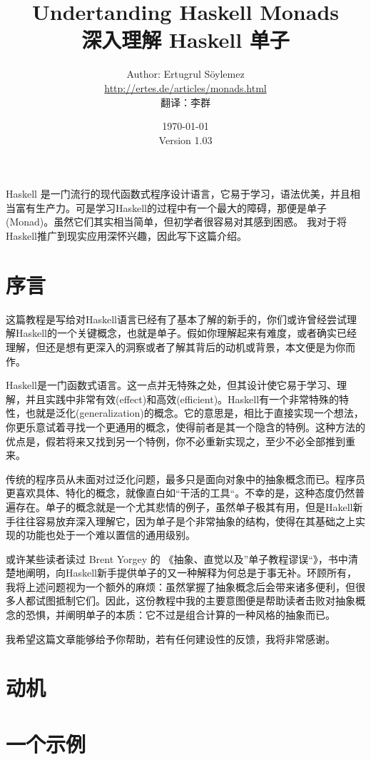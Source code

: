 \documentclass[11pt]{article} %
\title{Undertanding Haskell Monads\\
深入理解 Haskell 单子}
\author{Author: Ertugrul S\"oylemez\\
\url{http://ertes.de/articles/monads.html}\\[2mm]
翻译：李群}
\date{\today\\
Version 1.03}
\begin{document}
\maketitle

Haskell 是一门流行的现代函数式程序设计语言，它易于学习，语法优美，并且相当富有生产力。可是学习Haskell的过程中有一个最大的障碍，那便是单子(Monad)。虽然它们其实相当简单，但初学者很容易对其感到困惑。 我对于将Haskell推广到现实应用深怀兴趣，因此写下这篇介绍。

\renewcommand\contentsname{目录}
\tableofcontents

\section{序言}

这篇教程是写给对Haskell语言已经有了基本了解的新手的，你们或许曾经尝试理解Haskell的一个关键概念，也就是单子。假如你理解起来有难度，或者确实已经理解，但还是想有更深入的洞察或者了解其背后的动机或背景，本文便是为你而作。

Haskell是一门函数式语言。这一点并无特殊之处，但其设计使它易于学习、理解，并且实践中非常有效(effect)和高效(efficient)。Haskell有一个非常特殊的特性，也就是泛化(generalization)的概念。它的意思是，相比于直接实现一个想法，你更乐意试着寻找一个更通用的概念，使得前者是其一个隐含的特例。这种方法的优点是，假若将来又找到另一个特例，你不必重新实现之，至少不必全部推到重来。

传统的程序员从未面对过泛化问题，最多只是面向对象中的抽象概念而已。程序员更喜欢具体、特化的概念，就像直白如“干活的工具“。不幸的是，这种态度仍然普遍存在。单子的概念就是一个尤其悲情的例子，虽然单子极其有用，但是Hakell新手往往容易放弃深入理解它，因为单子是个非常抽象的结构，使得在其基础之上实现的功能也处于一个难以置信的通用级别。

或许某些读者读过 Brent Yorgey 的 《抽象、直觉以及”单子教程谬误“》，书中清楚地阐明，向Haskell新手提供单子的又一种解释为何总是于事无补。环顾所有，我将上述问题视为一个额外的麻烦：虽然掌握了抽象概念后会带来诸多便利，但很多人都试图抵制它们。因此，这份教程中我的主要意图便是帮助读者击败对抽象概念的恐惧，并阐明单子的本质：它不过是组合计算的一种风格的抽象而已。

我希望这篇文章能够给予你帮助，若有任何建设性的反馈，我将非常感谢。

\section{动机}
\section{一个示例}
\end{document}
